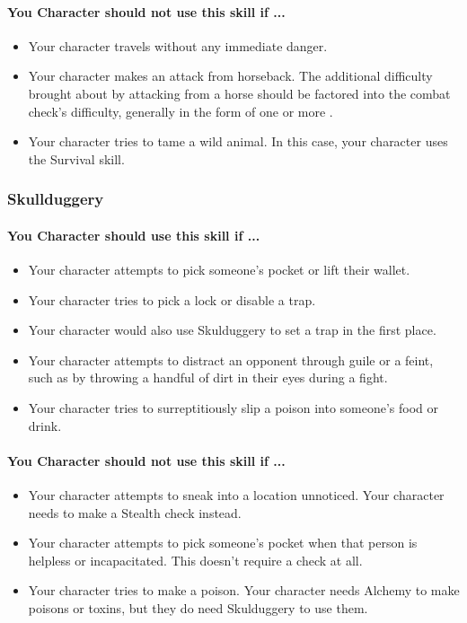 \begin{multicols}{2}
\paragraph{You Character should not use this skill if ...}
\begin{itemize}
    \item Your character travels without any immediate danger.
    \item Your character makes an attack from horseback. The additional difficulty
        brought about by attacking from a horse should be factored into the combat
        check's difficulty, generally in the form of one or more \difficulty.
    \item Your character tries to tame a wild animal. In this case, your character
        uses the Survival skill.
\end{itemize}

\subsubsection{Skullduggery}\label{skill:skullduggery}
\paragraph{You Character should use this skill if ...}
\begin{itemize}
    \item Your character attempts to pick someone's pocket or lift their wallet.
    \item Your character tries to pick a lock or disable a trap.
    \item Your character would also use Skulduggery to set a trap in the first
        place.
    \item Your character attempts to distract an opponent through guile or a feint,
        such as by throwing a handful of dirt in their eyes during a fight.
    \item Your character tries to surreptitiously slip a poison into someone's
        food or drink.
\end{itemize}
\paragraph{You Character should not use this skill if ...}
\begin{itemize}
    \item Your character attempts to sneak into a location unnoticed. Your
        character needs to make a Stealth check instead.
    \item Your character attempts to pick someone's pocket when that person is
        helpless or incapacitated. This doesn't require a check at all.
    \item Your character tries to make a poison. Your character needs Alchemy to
        make poisons or toxins, but they do need Skulduggery to use them.
\end{itemize}


\end{multicols}
